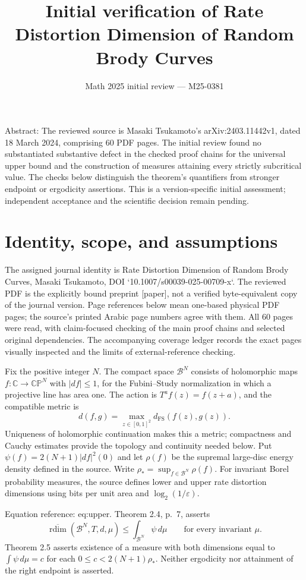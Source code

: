 \documentclass[10pt]{article}
\title{Initial verification of
Rate Distortion Dimension of Random Brody Curves}
\author{}
\date{Math 2025 initial review — M25-0381}
\begin{document}
\maketitle
Abstract: The reviewed source is Masaki Tsukamoto’s arXiv:2403.11442v1, dated 18 March 2024, comprising 60 PDF pages. The initial review found no substantiated substantive defect in the checked proof chains for the universal upper bound and the construction of measures attaining every strictly subcritical value. The checks below distinguish the theorem’s quantifiers from stronger endpoint or ergodicity assertions. This is a version-specific initial assessment; independent acceptance and the scientific decision remain pending.\par
\section*{Identity, scope, and assumptions}
The assigned journal identity is Rate Distortion Dimension of Random Brody Curves, Masaki Tsukamoto, DOI `10.1007/s00039-025-00709-x`. The reviewed PDF is the explicitly bound preprint [paper], not a verified byte-equivalent copy of the journal version. Page references below mean one-based physical PDF pages; the source’s printed Arabic page numbers agree with them. All 60 pages were read, with claim-focused checking of the main proof chains and selected original dependencies. The accompanying coverage ledger records the exact pages visually inspected and the limits of external-reference checking.\par
Fix the positive integer \(N\). The compact space \(\mathcal B^N\) consists of holomorphic maps \(f:\mathbb C\to\mathbb {CP}^N\) with \(|df|\leq1\), for the Fubini–Study normalization in which a projective line has area one. The action is \(T^af(z)=f(z+a)\), and the compatible metric is \[d(f,g)=\max_{z\in[0,1]^2}d_{\mathrm{FS}}(f(z),g(z)).\] Uniqueness of holomorphic continuation makes this a metric; compactness and Cauchy estimates provide the topology and continuity needed below. Put \(\psi(f)=2(N+1)|df|^2(0)\) and let \(\rho(f)\) be the supremal large-disc energy density defined in the source. Write \(\rho_*=\sup_{f\in\mathcal B^N}\rho(f)\). For invariant Borel probability measures, the source defines lower and upper rate distortion dimensions using bits per unit area and \(\log_2(1/\varepsilon)\).\par
Equation reference: eq:upper. Theorem 2.4, p. 7, asserts \[
 \overline{\operatorname{rdim}}(\mathcal B^N,T,d,\mu)\leq\int_{\mathcal B^N}\psi\,d\mu
 \qquad\text{for every invariant }\mu .\] Theorem 2.5 asserts existence of a measure with both dimensions equal to \(\int\psi\,d\mu=c\) for each \(0\leq c<2(N+1)\rho_*\). Neither ergodicity nor attainment of the right endpoint is asserted.\par
\end{document}
